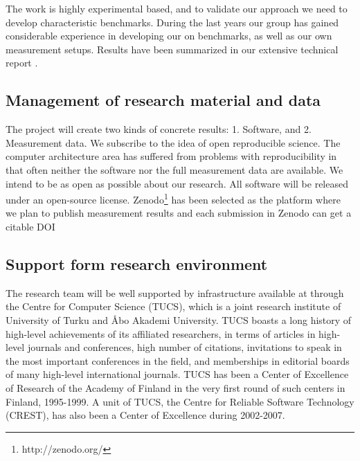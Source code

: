 \documentclass{article}
\begin{document}
The work is highly experimental based, and to validate our approach we need to develop characteristic benchmarks. 
During the last years our group has gained considerable experience in developing our on benchmarks, as well as our own measurement setups. 
Results have been summarized in our extensive technical report \cite{HolmbackaTechrep}. 

\subsection{Management of research material and data}
The project will create two kinds of concrete results: 1. Software, and 2. Measurement data. 
We subscribe to the idea of open reproducible science. 
The computer architecture area has suffered from problems with reproducibility in that often neither the software nor the full measurement data are available. 
We intend to be as open as possible about our research. 
All software will be released under an open-source license. 
Zenodo\footnote{http://zenodo.org/} has been selected as the platform where we plan to publish measurement results and each submission in Zenodo can get a citable DOI

\subsection{Support form research environment}
The research team will be well supported by infrastructure available at through the Centre for Computer Science (TUCS), 
which is a joint research institute of University of Turku and \AA{}bo Akademi University. 
TUCS boasts a long history of high-level achievements of its affiliated researchers, in terms of articles in high-level journals and conferences, high number of citations, 
invitations to speak in the most important conferences in the field, and memberships in editorial boards of many high-level international journals. 
TUCS has been a Center of Excellence of Research of the Academy of Finland in the very first round of such centers in Finland, 1995-1999. 
A unit of TUCS, the Centre for Reliable Software Technology (CREST), has also been a Center of Excellence during 2002-2007. 
\end{document}

